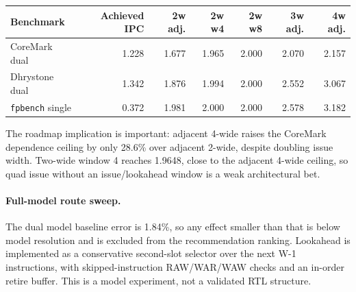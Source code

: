 \documentclass[10pt]{article}
\begin{document}
\begin{tabular}{@{}lrrrrrr@{}}
\toprule
Benchmark & Achieved IPC & 2w adj. & 2w w4 & 2w w8 & 3w adj. & 4w adj. \\
\midrule
CoreMark dual & 1.228 & 1.677 & 1.965 & 2.000 & 2.070 & 2.157 \\
Dhrystone dual & 1.342 & 1.876 & 1.994 & 2.000 & 2.552 & 3.067 \\
\texttt{fpbench} single & 0.372 & 1.981 & 2.000 & 2.000 & 2.578 & 3.182 \\
\bottomrule
\end{tabular}

The roadmap implication is important: adjacent 4-wide raises the CoreMark
dependence ceiling by only 28.6\% over adjacent 2-wide, despite doubling issue
width. Two-wide window 4 reaches 1.9648, close to the adjacent 4-wide ceiling,
so quad issue without an issue/lookahead window is a weak architectural bet.

\paragraph{Full-model route sweep.}
The dual model baseline error is 1.84\%, so any effect smaller than that is
below model resolution and is excluded from the recommendation ranking.
Lookahead is implemented as a conservative second-slot selector over the next
W-1 instructions, with skipped-instruction RAW/WAR/WAW checks and an in-order
retire buffer. This is a model experiment, not a validated RTL structure.
\end{document}
